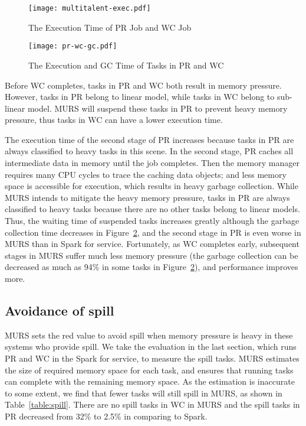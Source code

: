 \begin{figure}[!t]
\centering
\texttt{[image: multitalent-exec.pdf]}
\caption{The Execution Time of PR Job and WC Job}
\label{fig:pr-wc-exec}
\end{figure}

\begin{figure}[!t]
\centering
\texttt{[image: pr-wc-gc.pdf]}
\caption{The Execution and GC Time of Tasks in PR and WC}
\label{fig:pr-wc-gc}
\end{figure}

Before WC completes, tasks in PR and WC both result in memory pressure. However, tasks in PR belong to linear model, while tasks in WC belong to sub-linear model. MURS will suspend these tasks in PR to prevent heavy memory pressure, thus tasks in WC can have a lower execution time.

The execution time of the second stage of PR increases because tasks in PR are always classified to heavy tasks in this scene. In the second stage, PR caches all intermediate data in memory until the job completes. Then the memory manager requires many CPU cycles to trace the caching data objects; and less memory space is accessible for execution, which results in heavy garbage collection. While MURS intends to mitigate the heavy memory pressure, tasks in PR are always classified to heavy tasks because there are no other tasks belong to linear models. Thus, the waiting time of suspended tasks increases greatly although the garbage collection time decreases in Figure~\ref{fig:pr-wc-gc}, and the second stage in PR is even worse in MURS than in Spark for service. Fortunately, as WC completes early, subsequent stages  in MURS suffer much less memory pressure (the garbage collection can be decreased as much as 94\% in some tasks in Figure~\ref{fig:pr-wc-gc}), and performance improves more. 

\subsection{Avoidance of spill}

MURS sets the red value to avoid spill when memory pressure is heavy in these systems who provide spill. We take the evaluation in the last section, which runs PR and WC in the Spark for service, to measure the spill tasks. MURS estimates the size of required memory space for each task, and ensures that running tasks can complete with the remaining memory space. As the estimation is inaccurate to some extent, we find that fewer tasks will still spill in MURS, as shown in Table~\ref{table:spill}. There are no spill tasks in WC in MURS and the spill tasks in PR decreased from 32\% to 2.5\% in comparing to Spark.

